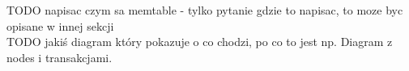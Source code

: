 
TODO napisac czym sa memtable - tylko pytanie gdzie to napisac, to moze byc opisane w innej sekcji \\






TODO jakiś diagram który pokazuje o co chodzi, po co to jest np. Diagram z nodes i transakcjami.
